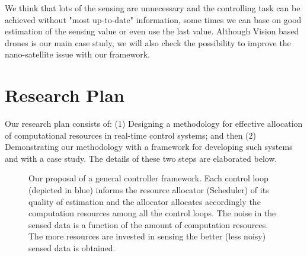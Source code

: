 \documentclass[11pt]{article}
\begin{document}
We think that lots of the sensing are unnecessary and the controlling task can be achieved without "most up-to-date" information, some times we can base on good estimation of the sensing value or even use the last value. Although Vision based drones is our main case study, we will also check the possibility to improve the nano-satellite issue with our framework.

\section{Research Plan}
\label{sec:Research Plan}

Our research plan consists of: (1) Designing a methodology for effective allocation of computational resources in real-time control systems; and then (2) Demonstrating our methodology with a framework for developing such systems and with a case study. The details of these two steps are elaborated below.


\begin{figure}[]
    \centering
    
    
    \caption{Our proposal of a general controller framework. Each control loop (depicted in blue) informs the resource allocator (Scheduler) of its quality of estimation and the allocator allocates accordingly the computation resources among all the control loops. The noise in the sensed data is a function of the amount of computation resources. The more resources are invested in sensing the better (less noisy) sensed data is obtained.
    \label{fig:general_hybrid_loop}}
\end{figure}
\end{document}
